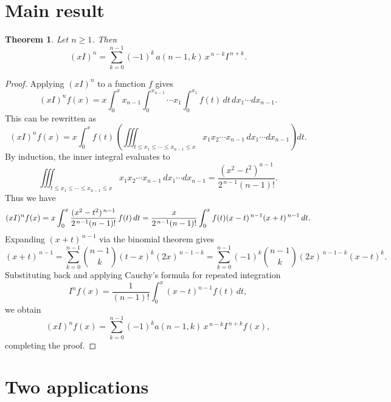 \documentclass[12pt,reqno]{article}
\theoremstyle{plain}
\newtheorem{theorem}{Theorem}[section]
\theoremstyle{definition}
\theoremstyle{remark}
\begin{document}
\section{Main result}
\begin{theorem}\label{th}
Let \(n\ge1\). Then
\begin{equation}\label{000}
(xI)^n = \sum_{k=0}^{n-1} (-1)^k\, a(n-1,k)\, x^{\,n-k} I^{\,n+k}.
\end{equation}
\end{theorem}
\begin{proof}
Applying \((xI)^n\) to a function \(f\) gives 
\[
(xI)^n f(x) = x \int_0^x x_{n-1} \int_0^{x_{n-1}} \cdots x_1 \int_0^{x_1} f(t)\, dt \, dx_1 \cdots dx_{n-1}.
\]
This can be rewritten as
\[
(xI)^n f(x) = x \int_0^x f(t) 
\left( \iiint_{t \le x_1 \le \cdots \le x_{n-1} \le x} x_1 x_2 \cdots x_{n-1} \, dx_1 \cdots dx_{n-1} \right) dt.
\]
By induction, the inner integral evaluates to
\[
\iiint_{t \le x_1 \le \cdots \le x_{n-1} \le x} x_1 x_2 \cdots x_{n-1} \, dx_1 \cdots dx_{n-1} = \frac{(x^2 - t^2)^{n-1}}{2^{\,n-1}(n-1)!}.
\]
Thus we have
\[
(xI)^n f(x) = x \int_0^x \frac{(x^2 - t^2)^{\,n-1}}{2^{\,n-1}(n-1)!}\,f(t) \, dt \\
= \frac{x}{2^{\,n-1}(n-1)!} \int_0^x f(t) (x-t)^{\,n-1} (x+t)^{\,n-1} \, dt.    
\]
Expanding \((x+t)^{\,n-1}\) via the binomial theorem gives
\[
(x+t)^{\,n-1} = \sum_{k=0}^{n-1} \binom{n-1}{k} (t-x)^k (2x)^{\,n-1-k} = \sum_{k=0}^{n-1} (-1)^k \binom{n-1}{k} (2x)^{\,n-1-k} (x-t)^k.
\]
Substituting back and applying Cauchy's formula for repeated integration
\[
I^nf(x)=\frac{1}{(n-1)!}\int_0^x(x-t)^{n-1}f(t)\,dt,
\]
we obtain
\[
(xI)^n f(x) = \sum_{k=0}^{n-1} (-1)^k a(n-1,k)\, x^{\,n-k} I^{\,n+k} f(x),
\]
completing the proof.
\end{proof}
\section{Two applications}
\end{document}
